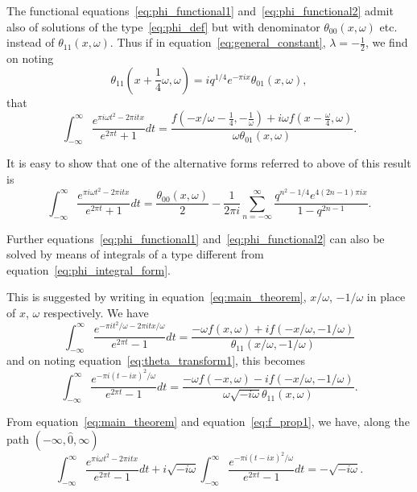 \documentclass[12pt]{article}
\theoremstyle{remark}
\begin{document}
The functional equations~\eqref{eq:phi_functional1} and~\eqref{eq:phi_functional2} admit also of solutions of the type~\eqref{eq:phi_def} but with denominator $\theta_{00}(x, \omega)$ etc. instead of $\theta_{11}(x, \omega)$. Thus if in equation~\eqref{eq:general_constant}, $\lambda = -\frac{1}{2}$, we find on noting
\begin{equation}\label{eq:theta_identity}
\theta_{11}\left(x + \frac{1}{4}\omega, \omega\right) = iq^{1/4}e^{-\pi ix}\theta_{01}(x, \omega),
\end{equation}
that
\begin{equation}\label{eq:alternative_form1}
\int_{-\infty}^\infty \frac{e^{\pi i\omega t^2 - 2\pi itx}}{e^{2\pi t} + 1} dt = \frac{f(-x/\omega - \frac{1}{4}, -\frac{1}{\omega}) + i\omega f(x - \frac{\omega}{4}, \omega)}{\omega \theta_{01}(x, \omega)}.
\end{equation}

It is easy to show that one of the alternative forms referred to above of this result is
\begin{equation}\label{eq:alternative_form2}
\int_{-\infty}^\infty \frac{e^{\pi i\omega t^2 - 2\pi itx}}{e^{2\pi t} + 1} dt = \frac{\theta_{00}(x, \omega)}{2} - \frac{1}{2\pi i} \sum_{n=-\infty}^\infty \frac{q^{n^2-1/4} e^{4(2n-1)\pi ix}}{1 - q^{2n-1}}.
\end{equation}

Further equations~\eqref{eq:phi_functional1} and~\eqref{eq:phi_functional2} can also be solved by means of integrals of a type different from equation~\eqref{eq:phi_integral_form}.

This is suggested by writing in equation~\eqref{eq:main_theorem}, $x/\omega$, $-1/\omega$ in place of $x$, $\omega$ respectively. We have
\begin{equation}\label{eq:transformed_integral}
\int_{-\infty}^\infty \frac{e^{-\pi it^2/\omega - 2\pi itx/\omega}}{e^{2\pi t} - 1} dt = \frac{-\omega f(x, \omega) + if(-x/\omega, -1/\omega)}{\theta_{11}(x/\omega, -1/\omega)}
\end{equation}
and on noting equation~\eqref{eq:theta_transform1}, this becomes
\begin{equation}\label{eq:simplified_form}
\int_{-\infty}^\infty \frac{e^{-\pi i(t-ix)^2/\omega}}{e^{2\pi t} - 1} dt = \frac{-\omega f(-x, \omega) - if(-x/\omega, -1/\omega)}{\omega \sqrt{-i\omega}\theta_{11}(x, \omega)}.
\end{equation}

From equation~\eqref{eq:main_theorem} and equation~\eqref{eq:f_prop1}, we have, along the path $(-\infty, \hat{0}, \infty)$
\begin{equation}\label{eq:combined_result}
\int_{-\infty}^\infty \frac{e^{\pi i\omega t^2 - 2\pi itx}}{e^{2\pi t} - 1} dt + i\sqrt{-i\omega} \int_{-\infty}^\infty \frac{e^{-\pi i(t-ix)^2/\omega}}{e^{2\pi t} - 1} dt = -\sqrt{-i\omega}.
\end{equation}
\end{document}
